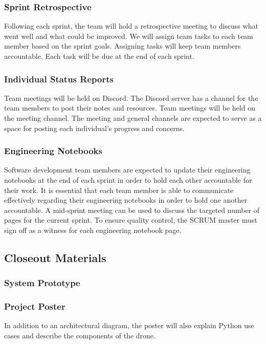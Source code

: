 \subsubsection{Sprint Retrospective}
Following each sprint, the team will hold a retrospective meeting to discuss what went well and what could be improved. We will assign team tasks to each team member based on the sprint goals. Assigning tasks will keep team members accountable. Each task will be due at the end of each sprint.

\subsubsection{Individual Status Reports}
Team meetings will be held on Discord. The Discord server has a channel for the team members to post their notes and resources. Team meetings will be held on the meeting channel. The meeting and general channels are expected to serve as a space for posting each individual's progress and concerns.

\subsubsection{Engineering Notebooks}
Software development team members are expected to update their engineering notebooks at the end of each sprint in order to hold each other accountable for their work. It is essential that each team member is able to communicate effectively regarding their engineering notebooks in order to hold one another accountable. A mid-sprint meeting can be used to discuss the targeted number of pages for the current sprint. To ensure quality control, the SCRUM master must sign off as a witness for each engineering notebook page.

\subsection{Closeout Materials}

\subsubsection{System Prototype}

\subsubsection{Project Poster}
In addition to an architectural diagram, the poster will also explain Python use cases and describe the components of the drone.

